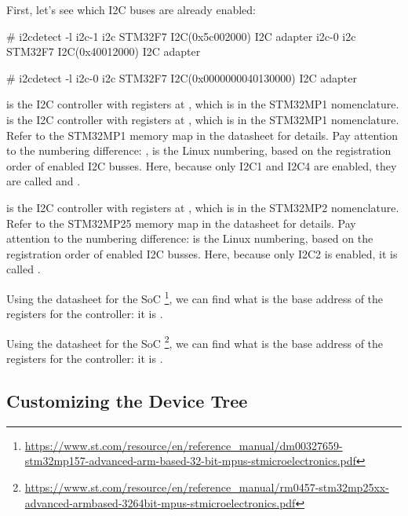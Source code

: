 First, let's see which I2C buses are already enabled:

\if{}
\begin{bashinput}
# i2cdetect -l
i2c-1	i2c             STM32F7 I2C(0x5c002000)                 I2C adapter
i2c-0	i2c             STM32F7 I2C(0x40012000)                 I2C adapter
\end{bashinput}
\fi
\if{}
\begin{bashinput}
# i2cdetect -l
i2c-0	i2c       	STM32F7 I2C(0x0000000040130000) 	I2C adapter
\end{bashinput}
\fi

\if{}
 is the I2C controller with registers at
, which is  in the STM32MP1
nomenclature.  is the I2C controller with registers at
, which is  in the STM32MP1
nomenclature. Refer to the STM32MP1 memory map in the datasheet for
details. Pay attention to the numbering difference: ,
 is the Linux numbering, based on the registration order
of enabled I2C busses. Here, because only I2C1 and I2C4 are enabled,
they are called  and .
\fi

\if{}
 is the I2C controller with registers at
, which is  in the STM32MP2
nomenclature. Refer to the STM32MP25 memory map in the datasheet for
details. Pay attention to the numbering difference:  is
the Linux numbering, based on the registration order of enabled I2C
busses. Here, because only I2C2 is enabled, it is called .
\fi

\if{}
Using the datasheet for the SoC
\footnote{\url{https://www.st.com/resource/en/reference_manual/dm00327659-stm32mp157-advanced-arm-based-32-bit-mpus-stmicroelectronics.pdf}},
we can find what is the base address of the registers for the
 controller: it is .
\fi

\if{}
Using the datasheet for the SoC
\footnote{\url{https://www.st.com/resource/en/reference_manual/rm0457-stm32mp25xx-advanced-armbased-3264bit-mpus-stmicroelectronics.pdf}},
we can find what is the base address of the registers for the
 controller: it is .
\fi

\subsection{Customizing the Device Tree}

